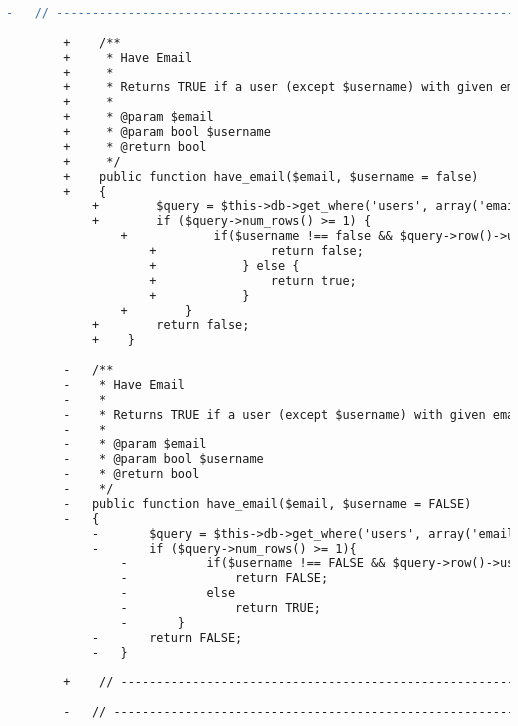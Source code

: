 \begin{lstlisting}[language=diff, caption=Perubahan pada kode User\_model.php]
		-	// ------------------------------------------------------------------------
		
		+    /**
		+     * Have Email
		+     *
		+     * Returns TRUE if a user (except $username) with given email exists
		+     *
		+     * @param $email
		+     * @param bool $username
		+     * @return bool
		+     */
		+    public function have_email($email, $username = false)
		+    {
			+        $query = $this->db->get_where('users', array('email' => $email));
			+        if ($query->num_rows() >= 1) {
				+            if($username !== false && $query->row()->username == $username) {
					+                return false;
					+            } else {
					+                return true;
					+            }
				+        }
			+        return false;
			+    }
		
		-	/**
		-	 * Have Email
		-	 *
		-	 * Returns TRUE if a user (except $username) with given email exists
		-	 *
		-	 * @param $email
		-	 * @param bool $username
		-	 * @return bool
		-	 */
		-	public function have_email($email, $username = FALSE)
		-	{
			-		$query = $this->db->get_where('users', array('email'=>$email));
			-		if ($query->num_rows() >= 1){
				-			if($username !== FALSE && $query->row()->username == $username)
				-				return FALSE;
				-			else
				-				return TRUE;
				-		}
			-		return FALSE;
			-	}
		
		+    // ------------------------------------------------------------------------
		
		-	// ------------------------------------------------------------------------
		

\end{lstlisting}
